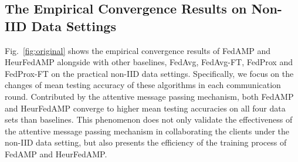 



\subsection{The Empirical Convergence Results on Non-IID Data Settings}
Fig.~\ref{fig:original} shows the empirical convergence results of FedAMP and HeurFedAMP alongside with other baselines, FedAvg, FedAvg-FT, FedProx and FedProx-FT on the practical non-IID data settings. 
Specifically, we focus on the changes of mean testing accuracy of these algorithms in each communication round.
Contributed by the attentive message passing mechanism, both FedAMP and HeurFedAMP converge to higher mean testing accuracies on all four data sets than baselines. This phenomenon does not only validate the effectiveness of the attentive message passing mechanism in collaborating the clients under the non-IID data setting, but also presents the efficiency of the training process of FedAMP and HeurFedAMP.


